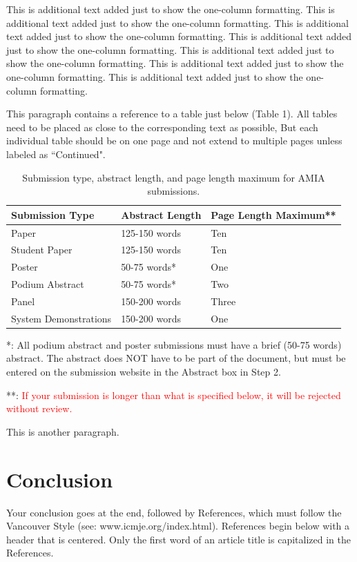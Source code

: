 \documentclass{amia}
\begin{document}
This is additional text added just to show the one-column formatting.  This is additional text added just to show the one-column formatting.  This is additional text added just to show the one-column formatting.  This is additional text added just to show the one-column formatting.  This is additional text added just to show the one-column formatting.  This is additional text added just to show the one-column formatting.  This is additional text added just to show the one-column formatting.

This paragraph contains a reference to a table just below (Table 1).  All tables need to be placed as close to the corresponding text as possible, But each individual table should be on one page and not extend to multiple pages unless labeled as ``Continued".

\begin{table}[h]
\centering
\caption{Submission type, abstract length, and page length maximum for AMIA submissions.}
  \begin{tabular}{|l|l|l|}
  \hline
    \textbf{Submission Type}    & \textbf{Abstract Length}  & \textbf{Page Length Maximum**} \\ \hline
    Paper  & 125-150 words  & Ten   \\ \hline
    Student Paper  & 125-150 words  & Ten \\ \hline
    Poster  &50-75 words*   & One \\ \hline
    Podium  Abstract & 50-75 words*  & Two \\ \hline
    Panel   &150-200 words  & Three \\ \hline
    System Demonstrations    &150-200 words  & One \\ \hline
  \end{tabular}
\end{table}
*: All podium abstract and poster submissions must have a brief (50-75 words) abstract. The abstract does NOT have to be part of the document, but must be entered on the submission website in the Abstract box in Step 2.

**: \textcolor{red}{If your submission is longer than what is specified below, it will be rejected without review.}

This is another paragraph.

\section*{Conclusion}
Your conclusion goes at the end, followed by References, which must follow the Vancouver Style (see: www.icmje.org/index.html).  References begin below with a header that is centered.  Only the first word of an article title is capitalized in the References. 
\end{document}
